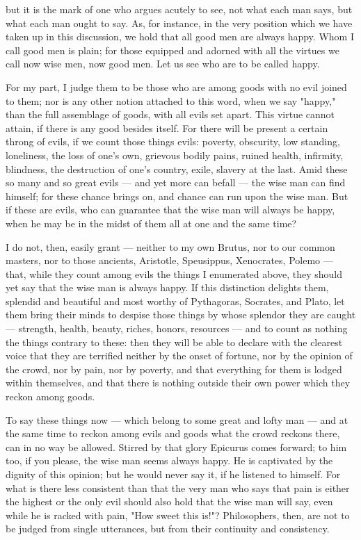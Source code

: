  but it is the mark of one who argues acutely to see, not what each man says, but what each man ought to say. As, for instance, in the very position which we have taken up in this discussion, we hold that all good men are always happy. Whom I call good men is plain; for those equipped and adorned with all the virtues we call now wise men, now good men. Let us see who are to be called happy.

 For my part, I judge them to be those who are among goods with no evil joined to them; nor is any other notion attached to this word, when we say "happy," than the full assemblage of goods, with all evils set apart. This virtue cannot attain, if there is any good besides itself. For there will be present a certain throng of evils, if we count those things evils: poverty, obscurity, low standing, loneliness, the loss of one's own, grievous bodily pains, ruined health, infirmity, blindness, the destruction of one's country, exile, slavery at the last. Amid these so many and so great evils — and yet more can befall — the wise man can find himself; for these chance brings on, and chance can run upon the wise man. But if these are evils, who can guarantee that the wise man will always be happy, when he may be in the midst of them all at one and the same time?

 I do not, then, easily grant — neither to my own Brutus, nor to our common masters, nor to those ancients, Aristotle, Speusippus, Xenocrates, Polemo — that, while they count among evils the things I enumerated above, they should yet say that the wise man is always happy. If this distinction delights them, splendid and beautiful and most worthy of Pythagoras, Socrates, and Plato, let them bring their minds to despise those things by whose splendor they are caught — strength, health, beauty, riches, honors, resources — and to count as nothing the things contrary to these: then they will be able to declare with the clearest voice that they are terrified neither by the onset of fortune, nor by the opinion of the crowd, nor by pain, nor by poverty, and that everything for them is lodged within themselves, and that there is nothing outside their own power which they reckon among goods.

 To say these things now — which belong to some great and lofty man — and at the same time to reckon among evils and goods what the crowd reckons there, can in no way be allowed. Stirred by that glory Epicurus comes forward; to him too, if you please, the wise man seems always happy. He is captivated by the dignity of this opinion; but he would never say it, if he listened to himself. For what is there less consistent than that the very man who says that pain is either the highest or the only evil should also hold that the wise man will say, even while he is racked with pain, "How sweet this is!"? Philosophers, then, are not to be judged from single utterances, but from their continuity and consistency.

